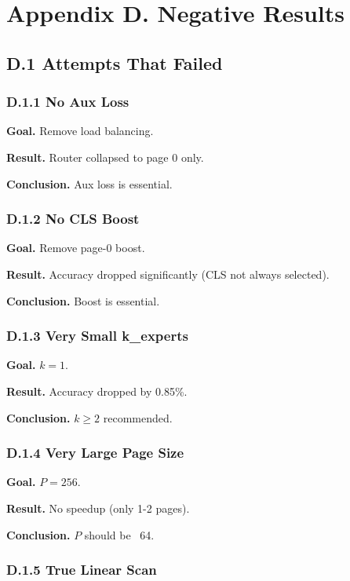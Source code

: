 \section{Appendix D. Negative Results}

\subsection{D.1 Attempts That Failed}

\subsubsection{D.1.1 No Aux Loss}

\textbf{Goal.} Remove load balancing.

\textbf{Result.} Router collapsed to page 0 only.

\textbf{Conclusion.} Aux loss is essential.

\subsubsection{D.1.2 No CLS Boost}

\textbf{Goal.} Remove page-0 boost.

\textbf{Result.} Accuracy dropped significantly (CLS not always selected).

\textbf{Conclusion.} Boost is essential.

\subsubsection{D.1.3 Very Small k\_experts}

\textbf{Goal.} $k = 1$.

\textbf{Result.} Accuracy dropped by 0.85\%.

\textbf{Conclusion.} $k \geq 2$ recommended.

\subsubsection{D.1.4 Very Large Page Size}

\textbf{Goal.} $P = 256$.

\textbf{Result.} No speedup (only 1-2 pages).

\textbf{Conclusion.} $P$ should be ~64.

\subsubsection{D.1.5 True Linear Scan}

